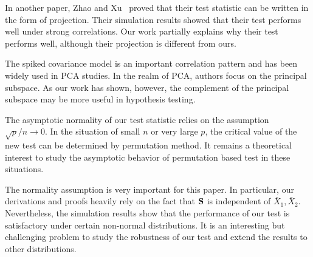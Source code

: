 \documentclass[times,sort&compress,3p]{elsarticle}
\theoremstyle{plain}
\newtheorem{lemma}{\quad\quad Lemma}
\theoremstyle{definition}
\theoremstyle{remark}
\begin{document}

In another paper, Zhao and Xu~\cite{Zhao2016A} proved that their test statistic can be written in the form of projection. Their simulation results showed that their test performs well under strong correlations.
Our work partially explains why their test performs well, although their projection is different from ours. 

 The spiked covariance model is an important correlation pattern and has been widely used in PCA studies.
 In the realm of PCA, authors focus on the principal subspace.
 As our work has shown, however, the complement of the principal subspace may be more useful in hypothesis testing. 


The asymptotic normality of our test statistic relies on the assumption $\sqrt{p}/n\to 0$. In the situation of small $n$ or very large $p$, the critical value of the new test can be determined by permutation method. It remains a theoretical interest to study the asymptotic behavior of permutation based test in these situations.

The normality assumption is very important for this paper.
In particular, our derivations and proofs heavily rely on the fact that $\mathbf{S}$ is independent of $\bar{X}_1,\bar{X}_2$.
Nevertheless, the simulation results show that the performance of our test is satisfactory under certain non-normal distributions.
It is an interesting but challenging problem to study the robustness of our test and extend the results to other distributions.





\end{document}
